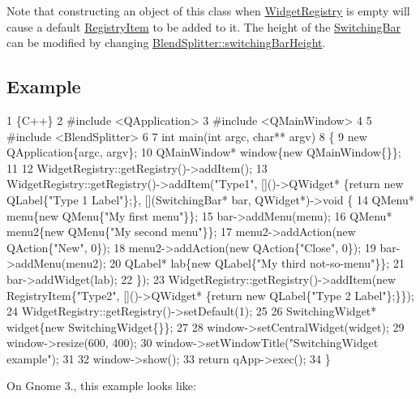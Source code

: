 Note that constructing an object of this class when \hyperlink{class_widget_registry}{Widget\+Registry} is empty will cause a default \hyperlink{class_registry_item}{Registry\+Item} to be added to it. The height of the \hyperlink{class_switching_bar}{Switching\+Bar} can be modified by changing \hyperlink{class_blend_splitter_a478fa3cfcf59f76edf8f021bee297e0d}{Blend\+Splitter\+::switching\+Bar\+Height}.

\subsection*{Example }


\begin{DoxyCode}
1 \{C++\}
2 #include <QApplication>
3 #include <QMainWindow>
4 
5 #include <BlendSplitter>
6 
7 int main(int argc, char** argv)
8 \{
9     new QApplication\{argc, argv\};
10     QMainWindow* window\{new QMainWindow\{\}\};
11 
12     WidgetRegistry::getRegistry()->addItem();
13     WidgetRegistry::getRegistry()->addItem("Type1", []()->QWidget* \{return new QLabel\{"Type 1 Label"\};\},
       [](SwitchingBar* bar, QWidget*)->void \{
14         QMenu* menu\{new QMenu\{"My first menu"\}\};
15         bar->addMenu(menu);
16         QMenu* menu2\{new QMenu\{"My second menu"\}\};
17         menu2->addAction(new QAction\{"New", 0\});
18         menu2->addAction(new QAction\{"Close", 0\});
19         bar->addMenu(menu2);
20         QLabel* lab\{new QLabel\{"My third not-so-menu"\}\};
21         bar->addWidget(lab);
22     \});
23     WidgetRegistry::getRegistry()->addItem(new RegistryItem\{"Type2", []()->QWidget* \{return new
       QLabel\{"Type 2 Label"\};\}\});
24     WidgetRegistry::getRegistry()->setDefault(1);
25 
26     SwitchingWidget* widget\{new SwitchingWidget\{\}\};
27 
28     window->setCentralWidget(widget);
29     window->resize(600, 400);
30     window->setWindowTitle("SwitchingWidget example");
31 
32     window->show();
33     return qApp->exec();
34 \}
\end{DoxyCode}
 On Gnome 3., this example looks like\+:

